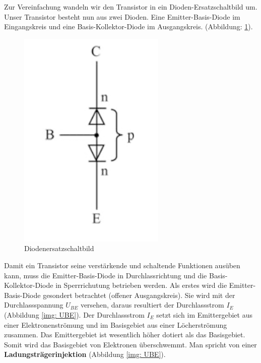 Zur Vereinfachung wandeln wir den Transistor in ein Dioden-Ersatzschaltbild um. Unser Transistor besteht nun aus zwei Dioden. Eine Emitter-Basis-Diode im Eingangskreis und eine Basis-Kollektor-Diode im Ausgangskreis. (Abbildung: \ref{img: Diodeersatzschaltbild}). 

\begin{figure}[!htb]
	\centering
	\includegraphics[scale=0.8]{images/Diodenersatzschaltbild.png} 
	\caption{Diodenersatzschaltbild \cite{Stiny2018} }
	\label{img: Diodeersatzschaltbild}
\end{figure}

Damit ein Transistor seine verstärkende und schaltende Funktionen ausüben kann, muss die Emitter-Basis-Diode in Durchlassrichtung und die Basis-Kollektor-Diode in Sperrrichutung betrieben werden. 
Als erstes wird die Emitter-Basis-Diode gesondert betrachtet (offener Ausgangskreis). Sie wird mit der Durchlassspannung $U_{BE}$ versehen, daraus resultiert der Durchlassstrom $I_E$ (Abbildung \ref{img: UBE}). Der Durchlassstrom $I_E$ setzt sich im Emittergebiet aus einer Elektronenströmung und im Basisgebiet aus einer Löcherströmung zusammen. Das Emittergebiet ist wesentlich höher dotiert als das Basisgebiet. Somit wird das Basisgebiet von Elektronen überschwemmt. Man spricht von einer \textbf{Ladungsträgerinjektion} (Abbildung \ref{img: UBE}).

